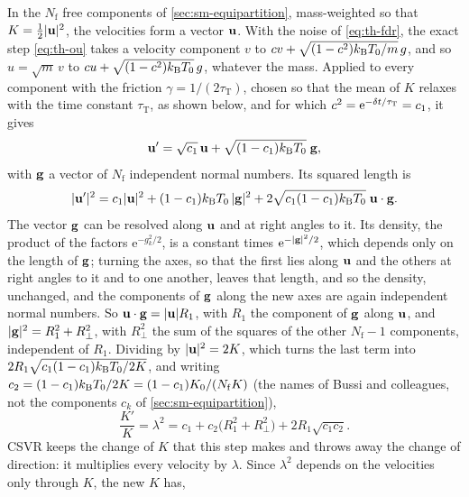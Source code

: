 In the $N_{\mathrm f}$ free components of \cref{sec:sm-equipartition},
mass-weighted so that $K = \frac12\lvert\bm{\mathrm{u}}\rvert^2$, the velocities
form a vector $\bm{\mathrm{u}}$. With the noise of \cref{eq:th-fdr}, the exact step
\cref{eq:th-ou} takes a velocity component $v$ to $cv + \sqrt{(1 -
c^2)k_{\mathrm{B}} T_0/m}\,g$, and so $u = \sqrt m\,v$ to $cu + \sqrt{(1 - c^2)k_{\mathrm{B}}
T_0}\,g$, whatever the mass. Applied to every component with the friction
$\gamma = 1/(2\tau_{\mathrm T})$, chosen so that the mean of $K$ relaxes
with the time constant $\tau_{\mathrm T}$, as shown below, and for which
$c^2 = \mathrm{e}^{-\delta t/\tau_{\mathrm T}} = c_1$, it gives
\begin{equation*}
   \bm{\mathrm{u}}' = \sqrt{c_1}\,\bm{\mathrm{u}} + \sqrt{(1 - c_1)k_{\mathrm{B}} T_0}\;\bm{\mathrm{g}} ,
\end{equation*}
with $\bm{\mathrm{g}}$ a vector of $N_{\mathrm f}$ independent normal numbers. Its
squared length is
\begin{equation*}
   \lvert\bm{\mathrm{u}}'\rvert^2 = c_1\lvert\bm{\mathrm{u}}\rvert^2 + (1 - c_1)k_{\mathrm{B}} T_0\,
   \lvert\bm{\mathrm{g}}\rvert^2 + 2\sqrt{c_1(1 - c_1)k_{\mathrm{B}} T_0}\;\bm{\mathrm{u}}\cdot\bm{\mathrm{g}} .
\end{equation*}
The vector $\bm{\mathrm{g}}$ can be resolved along $\bm{\mathrm{u}}$ and at right angles to
it. Its density, the product of the factors $\mathrm{e}^{-g_k^2/2}$, is a
constant times $\mathrm{e}^{-\lvert\bm{\mathrm{g}}\rvert^2/2}$, which depends only on
the length of $\bm{\mathrm{g}}$; turning the axes, so that the first lies along
$\bm{\mathrm{u}}$ and the others at right angles to it and to one another, leaves
that length, and so the density, unchanged, and the components of
$\bm{\mathrm{g}}$ along the new axes are again independent normal numbers. So
$\bm{\mathrm{u}}\cdot\bm{\mathrm{g}} = \lvert\bm{\mathrm{u}}\rvert R_1$, with $R_1$ the component of
$\bm{\mathrm{g}}$ along $\bm{\mathrm{u}}$, and $\lvert\bm{\mathrm{g}}\rvert^2 = R_1^2 + R_\perp^2$,
with $R_\perp^2$ the sum of the squares of the other $N_{\mathrm f} - 1$ components,
independent of $R_1$. Dividing by $\lvert\bm{\mathrm{u}}\rvert^2 = 2K$, which turns
the last term into $2R_1\sqrt{c_1(1 - c_1)k_{\mathrm{B}} T_0/2K}$, and writing $c_2
= (1 - c_1)k_{\mathrm{B}} T_0/2K = (1 - c_1)K_0/(N_{\mathrm f}K)$ (the names of Bussi
and colleagues, not the components $c_k$ of \cref{sec:sm-equipartition}),
\begin{equation}
   \frac{K'}{K} = \lambda^2 = c_1 + c_2\bigl(R_1^2 + R_\perp^2\bigr)
   + 2R_1\sqrt{c_1c_2} .
   \label{eq:th-csvr}
\end{equation}
CSVR keeps the change of $K$ that this step makes and throws away the
change of direction: it multiplies every velocity by $\lambda$. Since
$\lambda^2$ depends on the velocities only through $K$, the new $K$ has,
